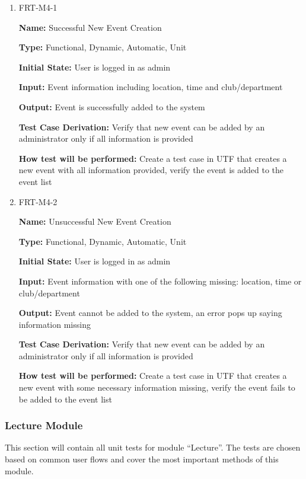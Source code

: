 \documentclass[12pt, titlepage]{article}
\begin{document}
\begin{enumerate}
\item{FRT-M4-1}

\textbf{Name:} Successful New Event Creation

\textbf{Type:} Functional, Dynamic, Automatic, Unit
					
\textbf{Initial State:} User is logged in as admin
					
\textbf{Input:} Event information including location, time and club/department
					
\textbf{Output:} Event is successfully added to the system

\textbf{Test Case Derivation:} Verify that new event can be added by an administrator only if all information is provided

\textbf{How test will be performed:} Create a test case in UTF that creates a new event with all information provided, verify the event is added to the event list

\item{FRT-M4-2}

\textbf{Name:} Unsuccessful New Event Creation

\textbf{Type:} Functional, Dynamic, Automatic, Unit
					
\textbf{Initial State:} User is logged in as admin
					
\textbf{Input:} Event information with one of the following missing: location, time or club/department
					
\textbf{Output:} Event cannot be added to the system, an error pops up saying information missing

\textbf{Test Case Derivation:} Verify that new event can be added by an administrator only if all information is provided

\textbf{How test will be performed:} Create a test case in UTF that creates a new event with some necessary information missing, verify the event fails to be added to the event list
\end{enumerate}

\subsubsection{Lecture Module}

This section will contain all unit tests for module ``Lecture''. The tests are chosen based on common user flows and cover the most important methods of this module.
\end{document}
